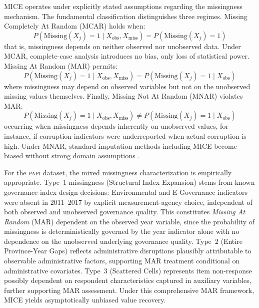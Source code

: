 \documentclass[12pt,a4paper]{article}
\newcommand{\PAPI}{\textsc{papi}\xspace}
\begin{document}
MICE operates under explicitly stated assumptions regarding the missingness mechanism. The fundamental classification distinguishes three regimes. Missing Completely At Random (MCAR) holds when:
\begin{equation}
\label{eq:mcar}
P(\text{Missing}(X_j) = 1 \mid X_{\text{obs}}, X_{\text{miss}}) = P(\text{Missing}(X_j) = 1)
\end{equation}
that is, missingness depends on neither observed nor unobserved data. Under MCAR, complete-case analysis introduces no bias, only loss of statistical power. Missing At Random (MAR) permits:
\begin{equation}
\label{eq:mar}
P(\text{Missing}(X_j) = 1 \mid X_{\text{obs}}, X_{\text{miss}}) = P(\text{Missing}(X_j) = 1 \mid X_{\text{obs}})
\end{equation}
where missingness may depend on observed variables but not on the unobserved missing values themselves. Finally, Missing Not At Random (MNAR) violates MAR:
\begin{equation}
\label{eq:mnar}
P(\text{Missing}(X_j) = 1 \mid X_{\text{obs}}, X_{\text{miss}}) \neq P(\text{Missing}(X_j) = 1 \mid X_{\text{obs}})
\end{equation}
occurring when missingness depends inherently on unobserved values, for instance, if corruption indicators were underreported when actual corruption is high. Under MNAR, standard imputation methods including MICE become biased without strong domain assumptions \citep{vanBuuren2018}.

For the \PAPI dataset, the mixed missingness characterization is empirically appropriate. Type~1 missingness (Structural Index Expansion) stems from known governance index design decisions: Environmental and E-Governance indicators were absent in 2011--2017 by explicit measurement-agency choice, independent of both observed and unobserved governance quality. This constitutes \emph{Missing At Random} (MAR) dependent on the observed year variable, since the probability of missingness is deterministically governed by the year indicator alone with no dependence on the unobserved underlying governance quality. Type~2 (Entire Province-Year Gaps) reflects administrative disruptions plausibly attributable to observable administrative factors, supporting MAR treatment conditional on administrative covariates. Type~3 (Scattered Cells) represents item non-response possibly dependent on respondent characteristics captured in auxiliary variables, further supporting MAR assessment. Under this comprehensive MAR framework, MICE yields asymptotically unbiased value recovery.
\end{document}
